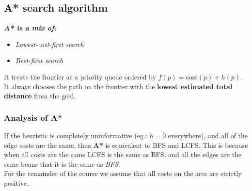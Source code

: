 \documentclass{article}
\theoremstyle{definition}
\begin{document}
\subsection*{A* search algorithm}
\textit{\textbf{A* is a mix of:}}
\begin{itemize}
	\item \textit{Lowest-cost-first search}
	\item \textit{Best-first search}
\end{itemize}
It treats the frontier as a priority queue ordered by {\color{OliveGreen} $ f(p) = \text{cost}(p) + h(p) $}. It always chooses the path on the frontier with the \textbf{lowest estimated total distance} from the goal.
\subsubsection*{Analysis of A*}
If the heuristic is completely uninformative (eg.: $ h = 0  $ everywhere), and all of the edge costs are the same, then \textbf{A*} is equivalent to BFS and LCFS. This is because when all costs ate the same LCFS is the same as BFS, and all the edges are the same beans that it is the same as \textit{BFS}.\\
For the remainder of the course we assume that all costs on the arcs are strictly positive. 
\end{document}
